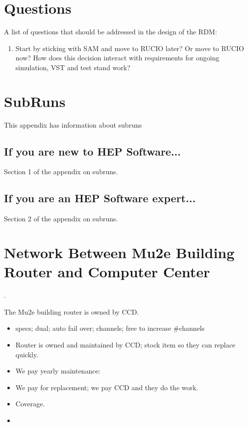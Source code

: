 \chapter{Questions}

A list of questions that should be addressed in the design of the RDM:

\begin{enumerate}
\item Start by sticking with SAM and move to RUCIO later?  Or move to RUCIO now?
  How does this decision interact with requirements for ongoing simulation, VST
  and test stand work?
\end{enumerate}


\appendix

\chapter{SubRuns}
\label{ch:app_Subruns}

This appendix has information about subruns

\section{If you are new to HEP Software...}

Section 1 of the appendix on subruns.

\section{If you are an HEP Software expert...}

Section 2 of the appendix on subruns.

\chapter{Network Between Mu2e Building Router and Computer Center}
\label{app:RouterAndNetwork}.

The Mu2e building router is owned by CCD.
\begin{itemize}
\item specs; dual; auto fail over; channels; free to increase \#channels
\item Router is owned and maintained by CCD; stock item so they can replace quickly.
\item We pay yearly maintenance: 
\item We pay for replacement; we pay CCD and they do the work. 
\item {} Coverage.
\item {}
\end{itemize}


